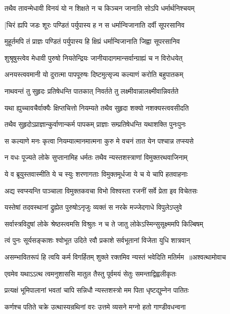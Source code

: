 \twolineshloka
{तथैव तावन्मेधावी विनयं यो न शिक्षते}
{न च किञ्चन जानाति सोऽपि धर्मार्थनिश्चयम्}


\twolineshloka
{[चिरं ह्यपि जडः शूरः पण्डितं पर्युपास्य ह}
{न स धर्मान्विजानाति दर्वी सूपरसानिव}


\twolineshloka
{मुहूर्तमपि तं प्राज्ञः पण्डितं पर्युपास्य हि}
{क्षिप्रं धर्मान्विजानाति जिह्वा सूपरसानिव}


\twolineshloka
{शुश्रूषुस्त्वेव मेधावी पुरुषो नियतेन्द्रियः}
{जानीयादागमान्सर्वान्ग्राह्यं च न विरोधयेत्}


\twolineshloka
{अनयस्त्ववमानी यो दुरात्मा पापपूरुषः}
{दिष्टमुत्सृज्य कल्याणं करोति बहुपातकम्}


\twolineshloka
{नाथवन्तं तु सुहृदः प्रतिषेधन्ति पातकात्}
{निवर्तते तु लक्ष्मीवान्नालक्ष्मीवान्निवर्तते}


\twolineshloka
{यथा ह्युच्चावचैर्वाक्यैः क्षिप्तचित्तो नियम्यते}
{तथैव सुहृदा शक्यो नशक्यस्त्ववसीदति}


\twolineshloka
{तथैव सुहृदोऽप्राज्ञान्कुर्वाणान्कर्म पापकम्}
{प्राज्ञाः सम्प्रतिषेधन्ति यथाशक्ति पुनःपुनः}


\twolineshloka
{स कल्याणे मनः कृत्वा नियम्यात्मानमात्मना}
{कुरु मे वचनं तात येन पश्चान्न तप्स्यसे}


\twolineshloka
{न वधः पूज्यते लोके सुप्तानामिह धर्मतः}
{तथैव न्यस्तशस्त्राणां विमुक्तरथवाजिनाम्}


\twolineshloka
{ये व ब्रूयुस्तवास्मीति ये च स्युः शरणागताः}
{विमुक्तमूर्धजा ये च ये चापि हतवाहनाः}


\twolineshloka
{अद्य स्वप्स्यन्ति पाञ्चाला विमुक्तकवचा विभो}
{विश्वस्ता रजनीं सर्वे प्रेता इव विचेतसः}


\twolineshloka
{यस्तेषां तदवस्थानां द्रुह्येत पुरुषोऽनृजुः}
{व्यक्तं स नरके मज्जेदगाधे विपुलेऽप्लुवे}


\twolineshloka
{सर्वास्त्रविदुषां लोके श्रेष्ठस्त्वमसि विश्रुतः}
{न च ते जातु लोकेऽस्मिन्सुसूक्ष्ममपि किल्बिषम्}


\twolineshloka
{त्वं पुनः सूर्यसङ्काशः श्वोभूत उदिते रवौ}
{प्रकाशे सर्वभूतानां विजेता युधि शात्रवान्}


\threelineshloka
{असम्भावितरूपं हि त्वयि कर्म विगर्हितम्}
{शुक्ले रक्तमिव न्यस्तं भवेदिति मतिर्मम ॥अश्वत्थामोवाच}
{}


\twolineshloka
{एवमेव यथाऽऽत्थ त्वमनुशाससि मातुल}
{तैस्तु पूर्वमयं सेतुः समन्ताद्विह्वलीकृतः}


\twolineshloka
{प्रत्यक्षं भूमिपालानां भवतां चापि सन्निधौ}
{न्यस्तशस्त्रो मम पिता धृष्टद्युम्नेन पातितः}


\twolineshloka
{कर्णश्च पतिते चक्रे उत्थास्यन्रथिनां वरः}
{उत्तमे व्यसने मग्नो हतो गाण्डीवधन्वना}


